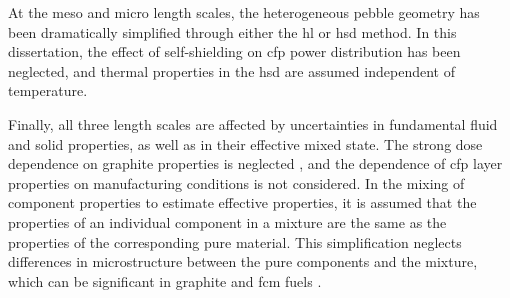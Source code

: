 At the meso and micro length scales, the heterogeneous pebble geometry has been dramatically simplified through either the \gls{hl} or \gls{hsd} method. In this dissertation, the effect of self-shielding on \gls{cfp} power distribution has been neglected, and thermal properties in the \gls{hsd} are assumed independent of temperature. 

Finally, all three length scales are affected by uncertainties in fundamental fluid and solid properties, as well as in their effective mixed state. The strong dose dependence on graphite properties is neglected \cite{seker}, and the dependence of \gls{cfp} layer properties on manufacturing conditions is not considered. In the mixing of component properties to estimate effective properties, it is assumed that the properties of an individual component in a mixture are the same as the properties of the corresponding pure material. This simplification neglects differences in microstructure between the pure components and the mixture, which can be significant in graphite and \gls{fcm} fuels \cite{folsom,lee2017}.

